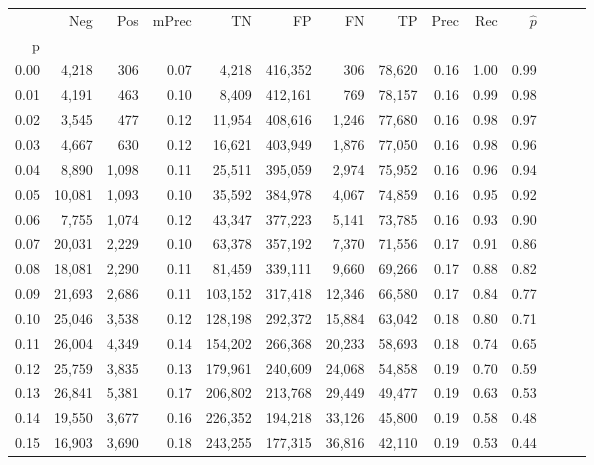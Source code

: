 \begin{tabular}{rrrrrrrrrrrrrr}
\toprule
{} &     Neg &    Pos & mPrec &       TN &       FP &      FN &      TP &  Prec &   Rec & $\hat{p}$ \\
p    &         &        &       &          &          &         &         &       &       &           \\
\midrule
0.00 &   4,218 &    306 &  0.07 &    4,218 &  416,352 &     306 &  78,620 &  0.16 &  1.00 &      0.99 \\
0.01 &   4,191 &    463 &  0.10 &    8,409 &  412,161 &     769 &  78,157 &  0.16 &  0.99 &      0.98 \\
0.02 &   3,545 &    477 &  0.12 &   11,954 &  408,616 &   1,246 &  77,680 &  0.16 &  0.98 &      0.97 \\
0.03 &   4,667 &    630 &  0.12 &   16,621 &  403,949 &   1,876 &  77,050 &  0.16 &  0.98 &      0.96 \\
0.04 &   8,890 &  1,098 &  0.11 &   25,511 &  395,059 &   2,974 &  75,952 &  0.16 &  0.96 &      0.94 \\
0.05 &  10,081 &  1,093 &  0.10 &   35,592 &  384,978 &   4,067 &  74,859 &  0.16 &  0.95 &      0.92 \\
0.06 &   7,755 &  1,074 &  0.12 &   43,347 &  377,223 &   5,141 &  73,785 &  0.16 &  0.93 &      0.90 \\
0.07 &  20,031 &  2,229 &  0.10 &   63,378 &  357,192 &   7,370 &  71,556 &  0.17 &  0.91 &      0.86 \\
0.08 &  18,081 &  2,290 &  0.11 &   81,459 &  339,111 &   9,660 &  69,266 &  0.17 &  0.88 &      0.82 \\
0.09 &  21,693 &  2,686 &  0.11 &  103,152 &  317,418 &  12,346 &  66,580 &  0.17 &  0.84 &      0.77 \\
0.10 &  25,046 &  3,538 &  0.12 &  128,198 &  292,372 &  15,884 &  63,042 &  0.18 &  0.80 &      0.71 \\
0.11 &  26,004 &  4,349 &  0.14 &  154,202 &  266,368 &  20,233 &  58,693 &  0.18 &  0.74 &      0.65 \\
0.12 &  25,759 &  3,835 &  0.13 &  179,961 &  240,609 &  24,068 &  54,858 &  0.19 &  0.70 &      0.59 \\
0.13 &  26,841 &  5,381 &  0.17 &  206,802 &  213,768 &  29,449 &  49,477 &  0.19 &  0.63 &      0.53 \\
0.14 &  19,550 &  3,677 &  0.16 &  226,352 &  194,218 &  33,126 &  45,800 &  0.19 &  0.58 &      0.48 \\
0.15 &  16,903 &  3,690 &  0.18 &  243,255 &  177,315 &  36,816 &  42,110 &  0.19 &  0.53 &      0.44 \\

\end{tabular}
